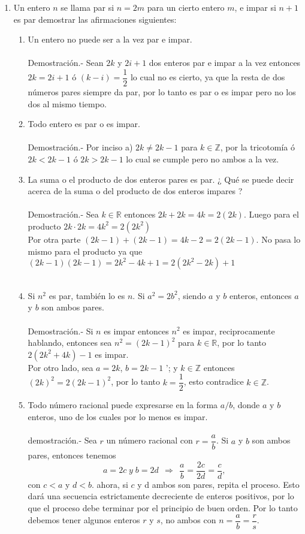 \begin{enumerate}[\bfseries  1.]
\item Un entero $n$ se llama par si $n=2m$ para un cierto entero $m$, e impar si $n+1$ es par demostrar las afirmaciones siguientes:
\begin{enumerate}[\bfseries a)]
\item Un entero no puede ser a la vez par e impar.\\\\
Demostración.- \; Sean $2k$ y $2i+1$ dos enteros par e impar a la vez  entonces $2k=2i+1$ ó  $(k-i)=\dfrac{1}{2}$  lo cual no es cierto, ya que la resta de dos números pares siempre da par, por lo tanto es par o es impar pero no los dos al mismo tiempo.\\
\item Todo entero es par o es impar.\\\\
Demostración.- \; Por inciso a) \; $2k\neq 2k-1$ para $k\in \mathbb{Z}$, por la tricotomía ó $2k < 2k-1$ ó $2k > 2k-1$ lo cual se cumple pero no ambos a la vez.\\  
\item La suma o el producto de dos enteros pares es par. ¿ Qué se puede decir acerca de la suma o del producto de dos enteros impares ?\\\\
Demostración.- \; Sea $k\in \mathbb{R}$ entonces $2k+2k=4k=2(2k)$. Luego para el producto $2k\cdot 2k = 4k^2=2(2k^2)$\\
Por otra parte $(2k-1)+(2k-1)=4k-2=2(2k-1)$. No pasa lo mismo para el producto ya que  $(2k-1)(2k-1)=2k^2-4k+1=2(2k^2-2k)+1$\\\\
\item Si $n^2$ es par, también lo es $n$. Si $a^2=2b^2$, siendo $a$ y $b$ enteros, entonces $a$ y $b$ son ambos pares.\\\\
Demostración.- \;  Si $n$ es impar entonces $n^2$ es impar, reciprocamente hablando, entonces sea $n^2=(2k-1)^2$ para $k\in \mathbb{R}$, por lo tanto $2(2k^2+4k)-1$ es impar.\\
Por otro lado, sea $a=2k$, $b=2k-1$ '; y \; $k\in \mathbb{Z}$ entonces $(2k)^2=2(2k-1)^2$, por lo tanto $k=\dfrac{1}{2}$, esto contradice $k\in \mathbb{Z}$.\\
\item Todo número racional puede expresarse en la forma $a/b$, donde $a$ y $b$ enteros, uno de los cuales por lo menos es impar.\\\\
demostración.- \; Sea $r$ un número racional con $r=\dfrac{a}{b}$. Si $a$\; y \; $b$ son ambos pares, entonces tenemos $$a=2c \; y \; b=2d \,\; \Rightarrow \,\; \dfrac{a}{b}=\dfrac{2c}{2d}=\dfrac{c}{d},$$ con $c<a$ \; y \; $d<b$. ahora, si $c$ \; y \; d ambos son pares, repita el proceso. Esto dará una secuencia estrictamente decreciente de enteros positivos, por lo que el proceso debe terminar por el principio de buen orden. Por lo tanto debemos tener algunos enteros $r$ \; y \; $s$, no ambos con $n=\dfrac{a}{b}=\dfrac{r}{s}$.
\end{enumerate}


\end{enumerate}
